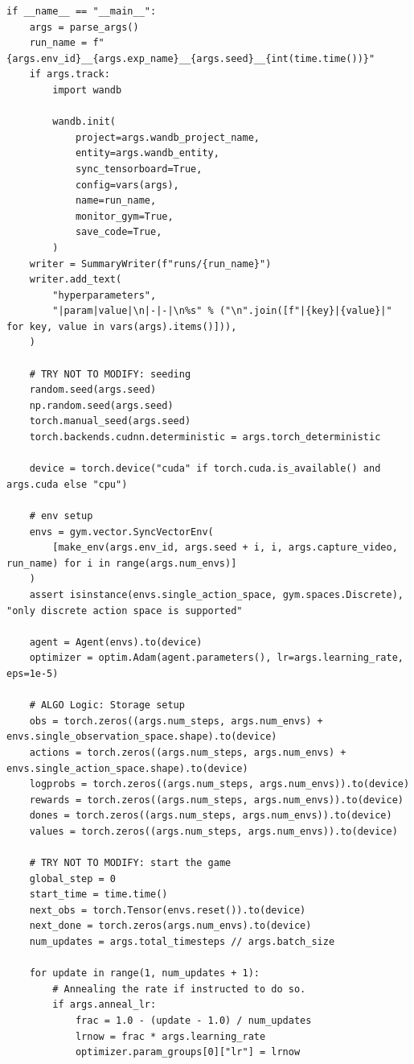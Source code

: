 \documentclass[11pt,a4paper]{article}
\begin{document}
\begin{lstlisting}
if __name__ == "__main__":
    args = parse_args()
    run_name = f"{args.env_id}__{args.exp_name}__{args.seed}__{int(time.time())}"
    if args.track:
        import wandb

        wandb.init(
            project=args.wandb_project_name,
            entity=args.wandb_entity,
            sync_tensorboard=True,
            config=vars(args),
            name=run_name,
            monitor_gym=True,
            save_code=True,
        )
    writer = SummaryWriter(f"runs/{run_name}")
    writer.add_text(
        "hyperparameters",
        "|param|value|\n|-|-|\n%s" % ("\n".join([f"|{key}|{value}|" for key, value in vars(args).items()])),
    )

    # TRY NOT TO MODIFY: seeding
    random.seed(args.seed)
    np.random.seed(args.seed)
    torch.manual_seed(args.seed)
    torch.backends.cudnn.deterministic = args.torch_deterministic

    device = torch.device("cuda" if torch.cuda.is_available() and args.cuda else "cpu")

    # env setup
    envs = gym.vector.SyncVectorEnv(
        [make_env(args.env_id, args.seed + i, i, args.capture_video, run_name) for i in range(args.num_envs)]
    )
    assert isinstance(envs.single_action_space, gym.spaces.Discrete), "only discrete action space is supported"

    agent = Agent(envs).to(device)
    optimizer = optim.Adam(agent.parameters(), lr=args.learning_rate, eps=1e-5)

    # ALGO Logic: Storage setup
    obs = torch.zeros((args.num_steps, args.num_envs) + envs.single_observation_space.shape).to(device)
    actions = torch.zeros((args.num_steps, args.num_envs) + envs.single_action_space.shape).to(device)
    logprobs = torch.zeros((args.num_steps, args.num_envs)).to(device)
    rewards = torch.zeros((args.num_steps, args.num_envs)).to(device)
    dones = torch.zeros((args.num_steps, args.num_envs)).to(device)
    values = torch.zeros((args.num_steps, args.num_envs)).to(device)

    # TRY NOT TO MODIFY: start the game
    global_step = 0
    start_time = time.time()
    next_obs = torch.Tensor(envs.reset()).to(device)
    next_done = torch.zeros(args.num_envs).to(device)
    num_updates = args.total_timesteps // args.batch_size

    for update in range(1, num_updates + 1):
        # Annealing the rate if instructed to do so.
        if args.anneal_lr:
            frac = 1.0 - (update - 1.0) / num_updates
            lrnow = frac * args.learning_rate
            optimizer.param_groups[0]["lr"] = lrnow


\end{lstlisting}
\end{document}
